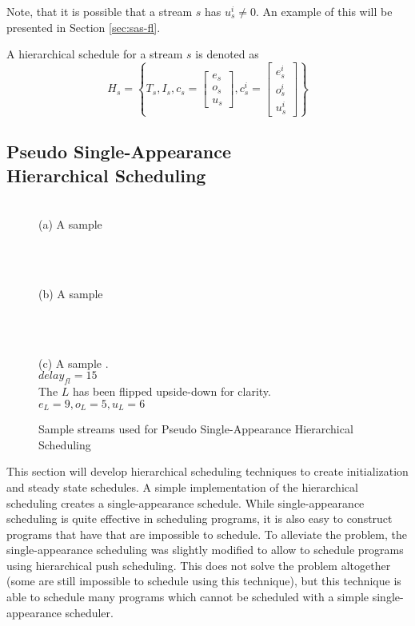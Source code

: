 Note, that it is possible that a stream $s$ has $u^i_s \ne 0$.  An
example of this will be presented in Section \ref{sec:sas-fl}.

A hierarchical schedule for a stream $s$ is denoted as $$H_s =
\left\{T_s, I_s, c_s = \left[\begin{array}{c}
e_s\\o_s\\u_s\end{array}\right], c^i_s =
\left[\begin{array}{c}e^i_s\\o^i_s\\u^i_s\end{array}\right]\right\}$$

\subsection{Pseudo Single-Appearance \\ Hierarchical Scheduling}
\label{sec:sas}

\begin{figure}
\begin{minipage}{1.5in}
\centering {} \\
{\protect\small (a) A sample {\pipeline}}
\end{minipage}
~
\begin{minipage}{1.5in}
\centering {} \\
{\protect\small (b) A sample {\splitjoin}}
\end{minipage}
~
\begin{minipage}{2.5in}
\centering {} \\
{\protect\small (c) A sample {\feedbackloop}.\\ $delay_{fl} = 15$ \\
The $L$ {\filter} has been flipped upside-down for clarity. \\$e_L
= 9, o_L = 5, u_L = 6$ }
\end{minipage}
\caption{Sample {\StreamIt} streams used for Pseudo
Single-Appearance Hierarchical Scheduling}
\label{fig:hierarchical-schedule}
\end{figure}

This section will develop hierarchical scheduling techniques to
create initialization and steady state schedules. A simple
implementation of the hierarchical scheduling creates a
single-appearance schedule.  While single-appearance scheduling is
quite effective in scheduling {\StreamIt} programs, it is also easy
to construct programs that have {\feedbackloops} that are impossible
to schedule.  To alleviate the problem, the single-appearance
scheduling was slightly modified to allow {\feedbackloops} to
schedule programs using hierarchical push scheduling.  This does
not solve the problem altogether (some {\feedbackloops} are still
impossible to schedule using this technique), but this technique
is able to schedule many programs which cannot be scheduled with a
simple single-appearance scheduler.

